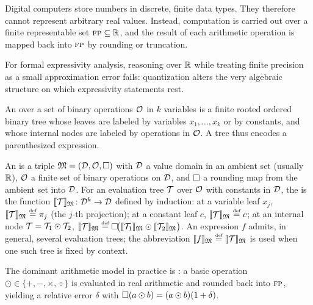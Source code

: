 \documentclass{article}
\begin{document}
Digital computers store numbers in discrete, finite data types. They therefore cannot represent arbitrary real values. Instead, computation is carried out over a finite representable set $\textsc{fp}\subseteq\mathbb{R}$, and the result of each arithmetic operation is mapped back into $\textsc{fp}$ by rounding or truncation.

For formal expressivity analysis, reasoning over $\mathbb{R}$ while treating finite precision as a small approximation error fails: quantization alters the very algebraic structure on which expressivity statements rest.

\begin{definition}\label{def:eval-tree}
An  over a set of binary operations $\mathcal{O}$ in $k$ variables is a finite rooted ordered binary tree whose leaves are labeled by variables $x_1, \ldots, x_k$ or by constants, and whose internal nodes are labeled by operations in $\mathcal{O}$.
A tree thus encodes a parenthesized expression.
\end{definition}

\begin{definition}\label{def:arith-model}
An  is a triple $\mathfrak{M} = (\mathcal{D}, \mathcal{O}, \square)$ with $\mathcal{D}$ a value domain in an ambient set (usually $\mathbb{R}$), $\mathcal{O}$ a finite set of binary operations on $\mathcal{D}$, and $\square$ a rounding map from the ambient set into $\mathcal{D}$.
For an evaluation tree $\mathcal{T}$ over $\mathcal{O}$ with constants in $\mathcal{D}$, the  is the function $\llbracket \mathcal{T} \rrbracket_{\mathfrak{M}} \colon \mathcal{D}^k \to \mathcal{D}$ defined by induction: at a variable leaf $x_j$, $\llbracket \mathcal{T} \rrbracket_{\mathfrak{M}} \mathrel{\stackrel{\textnormal{\tiny def}}{=}} \pi_j$ (the $j$-th projection); at a constant leaf $c$, $\llbracket \mathcal{T} \rrbracket_{\mathfrak{M}} \mathrel{\stackrel{\textnormal{\tiny def}}{=}} c$; at an internal node $\mathcal{T} = \mathcal{T}_1 \odot \mathcal{T}_2$, $\llbracket \mathcal{T} \rrbracket_{\mathfrak{M}} \mathrel{\stackrel{\textnormal{\tiny def}}{=}} \square\!\bigl( \llbracket \mathcal{T}_1 \rrbracket_{\mathfrak{M}} \odot \llbracket \mathcal{T}_2 \rrbracket_{\mathfrak{M}} \bigr)$.
An expression $f$ admits, in general, several evaluation trees; the abbreviation $\llbracket f \rrbracket_{\mathfrak{M}} \mathrel{\stackrel{\textnormal{\tiny def}}{=}} \llbracket \mathcal{T} \rrbracket_{\mathfrak{M}}$ is used when one such tree is fixed by context.
\end{definition}


The dominant arithmetic model in practice is :  
a basic operation $\odot \in \{+, -, \times, \div\}$ is evaluated in  real arithmetic and rounded back into $\textsc{fp}$, yielding a relative error $\delta$ with $\square(a \odot b) = (a \odot b)(1 + \delta)$. 
\end{document}

